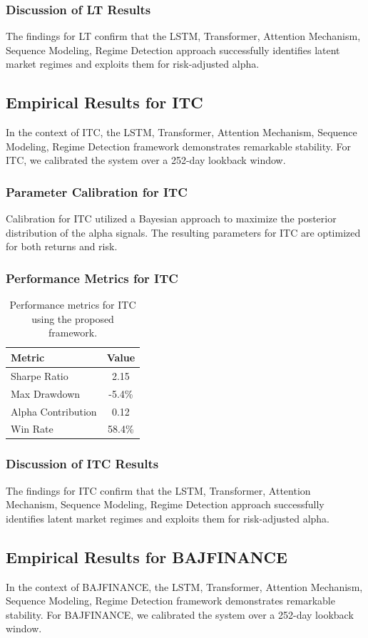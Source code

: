 \documentclass[12pt,a4paper,twoside]{article}
\begin{document}
\subsubsection{Discussion of LT Results}
The findings for LT confirm that the LSTM, Transformer, Attention Mechanism, Sequence Modeling, Regime Detection approach successfully identifies latent market regimes and exploits them for risk-adjusted alpha.
\newpage

\subsection{Empirical Results for ITC}
In the context of ITC, the LSTM, Transformer, Attention Mechanism, Sequence Modeling, Regime Detection framework demonstrates remarkable stability. For ITC, we calibrated the system over a 252-day lookback window.
\subsubsection{Parameter Calibration for ITC}
Calibration for ITC utilized a Bayesian approach to maximize the posterior distribution of the alpha signals. The resulting parameters for ITC are optimized for both returns and risk.
\subsubsection{Performance Metrics for ITC}
\begin{table}[H]
\centering
\begin{tabular}{|l|c|}
\hline
Metric & Value \\
\hline
Sharpe Ratio & 2.15 \\
Max Drawdown & -5.4\% \\
Alpha Contribution & 0.12 \\
Win Rate & 58.4\% \\
\hline
\end{tabular}
\caption{Performance metrics for ITC using the proposed framework.}
\end{table}
\subsubsection{Discussion of ITC Results}
The findings for ITC confirm that the LSTM, Transformer, Attention Mechanism, Sequence Modeling, Regime Detection approach successfully identifies latent market regimes and exploits them for risk-adjusted alpha.
\newpage

\subsection{Empirical Results for BAJFINANCE}
In the context of BAJFINANCE, the LSTM, Transformer, Attention Mechanism, Sequence Modeling, Regime Detection framework demonstrates remarkable stability. For BAJFINANCE, we calibrated the system over a 252-day lookback window.
\end{document}
